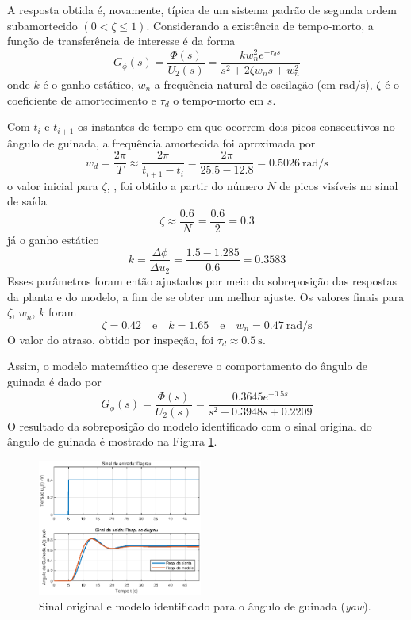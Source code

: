 A resposta obtida é, novamente, típica de um sistema padrão de segunda ordem subamortecido $( 0 < \zeta \leq 1)$. Considerando a existência de tempo-morto, a função de transferência de interesse é da forma
\begin{equation}\label{eq:FTYaw}
    G_{\phi}(s) = \frac{\Phi(s)}{U_{2}(s)} = \frac{k w_{n}^2 e^{-\tau_d s}}{s^2 + 2 \zeta w_{n} s + w_{n}^2}
\end{equation}
\noindent onde $k$ é o ganho estático, $w_n$ a frequência natural de oscilação (em $\si{\radian/\s}$), $\zeta$ é o coeficiente de amortecimento e $\tau_d$ o tempo-morto em $\si{s}$.

Com $t_{i}$ e $t_{i+1}$ os instantes de tempo em que ocorrem dois picos consecutivos no ângulo de guinada, a frequência amortecida foi aproximada por
$$ w_d = \frac{2 \pi}{T} \approx \frac{2 \pi}{t_{i+1} - t_i} = \frac{2 \pi}{25.5-12.8} = \SI{0.5026}{\radian/\s} $$
\noindent o valor inicial para $\zeta$, \cite{aguirre2004}, foi obtido a partir do número $N$ de picos visíveis no sinal de saída
$$ \zeta \approx \frac{0.6}{N} = \frac{0.6}{2} = 0.3 $$
\noindent já o ganho estático
$$ k = \frac{\Delta \phi}{\Delta u_{2}} = \frac{1.5 - 1.285}{0.6} = 0.3583 $$
Esses parâmetros foram então ajustados por meio da sobreposição das respostas da planta e do modelo, a fim de se obter um melhor ajuste. Os valores finais para $\zeta$, $w_{n}$, $k$ foram
$$ \zeta = 0.42 \quad\text{e}\quad k = 1.65 \quad\text{e}\quad w_{n} = \SI{0.47}{\radian/\s} $$
O valor do atraso, obtido por inspeção, foi $\tau_{d} \approx \SI{0.5}{\s}$.

Assim, o modelo matemático que descreve o comportamento do ângulo de guinada é dado por
\begin{equation}\label{eq:FTModeloIDYaw}
    G_{\phi}(s) = \frac{\Phi(s)}{U_{2}(s)} = \frac{0.3645 e^{-0.5 s}}{s^2 + 0.3948s + 0.2209}
\end{equation}
O resultado da sobreposição do modelo identificado com o sinal original do ângulo de guinada é mostrado na Figura \ref{fig:IdentificacaoYawAngleFinal}.

\begin{figure}[H]
    \centering
    \includegraphics[width=0.48\textwidth]{figures/Identificacao/IdentificaYawFinal.eps}
    \caption{Sinal original e modelo identificado para o ângulo de guinada (\textit{yaw}).}
    \label{fig:IdentificacaoYawAngleFinal}
\end{figure}

